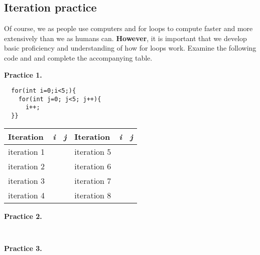 \documentclass{article}
\begin{document}
\begin{flushleft}

\newpage

\subsection{Iteration practice}

Of course, we as people use computers and for loops to compute faster and more extensively than we as humans can. \textbf{However}, it is important that we develop basic proficiency and understanding of how for loops work.
Examine the following code and and complete the accompanying table.\par

\textbf{Practice 1.}\\

\begin{verbatim}
  for(int i=0;i<5;){
    for(int j=0; j<5; j++){
      i++;
  }}
\end{verbatim}

\begin{longtabu} to 120mm { | X[l] | X[c] |  X[c] | X[l] |  X[c] |  X[c] |}
  \hline
  \textbf{Iteration}  & \textbf{ \emph{i}} &  \textbf{ \emph{j}} &\textbf{Iteration}  & \textbf{ \emph{i}} &  \textbf{ \emph{j}} \\

 \hline
 iteration 1 &  &  & iteration 5 &  &  \\ 
 \hline
 iteration 2 &  &  & iteration 6 &  &  \\ 
 \hline
iteration 3 &  &  & iteration 7 &  &  \\ 
\hline
iteration 4 &  &  & iteration 8 &  &  \\ 
\hline
\end{longtabu}


\noindent \textbf{Practice 2.}\\
\begin{verbatim}


\end{verbatim}



\noindent \textbf{Practice 3.}\\
\begin{verbatim}


\end{verbatim}


\end{flushleft}
\end{document}
